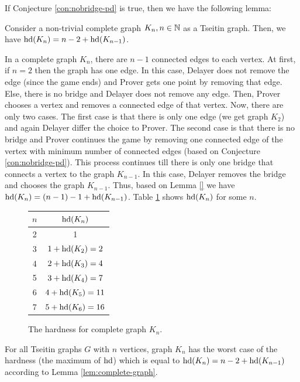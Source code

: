 \documentclass{report}
\begin{document}
If Conjecture \ref{con:nobridge-pd} is true, then we have the following lemma:	  
\begin{lem}\label{lem:complete-graph}
Consider a non-trivial complete graph $K_n, n \in \mathbb{N}$ as a Tseitin graph. Then, we have $\operatorname{hd}(K_n)= n-2+\operatorname{hd}(K_{n-1})$. 
\end{lem}	
\begin{prf}
In a complete graph $K_n$, there are $n-1$ connected edges to each vertex. At first, if $n =2$ then the graph has one edge. In this case, Delayer does not remove the edge (since the game ends) and Prover gets one point by removing that edge. Else, there is no bridge and Delayer does not remove any edge. Then, Prover chooses a vertex and removes a connected edge of that vertex. Now, there are only two cases. The first case is that there is only one edge (we get graph $K_2$) and again Delayer differ the choice to Prover. The second case is that there is no bridge and Prover continues the game by removing one connected edge of the vertex with minimum number of connected edges (based on Conjecture \ref{con:nobridge-pd}). This process continues till there is only one bridge that connects a vertex to the graph $K_{n-1}$. In this case, Delayer removes the bridge and chooses the graph $K_{n-1}$. Thus, based on Lemma \ref{} we have $\operatorname{hd}(K_n)= (n-1)-1+\operatorname{hd}(K_{n-1}) $. Table \ref{fig:table1} shows $\operatorname{hd}(K_n)$ for some $n$.
       \begin{figure}[h]
       \centering
       \begin{tabular}{|c|c|} 
                  \hline
                  $n$ & $\operatorname{hd}(K_n)$ \\ \hline
		  2 & 1  \\ \hline
		  3 & $1+ \operatorname{hd}(K_2)=2$ \\ \hline
		 4 & $2+ \operatorname{hd}(K_3)=4$  \\ \hline
		 5 & $3+ \operatorname{hd}(K_4)=7$  \\ \hline
		 6 & $4+ \operatorname{hd}(K_5)=11$  \\ \hline
		 7 & $5+ \operatorname{hd}(K_6)=16$  \\ \hline
       \end{tabular}
       \caption{The hardness for complete graph $K_n$.}
       \label{fig:table1}
      \end{figure}
\end{prf}
\begin{conj}\label{con:hd_game2}
For all Tseitin graphs $G$ with $n$ vertices, graph $K_n$ has the worst case of the hardness (the maximum of $\operatorname{hd}$) which is equal to $\operatorname{hd}(K_n)= n-2+\operatorname{hd}(K_{n-1})$ according to Lemma \ref{lem:complete-graph}.
\end{conj}
\end{document}
